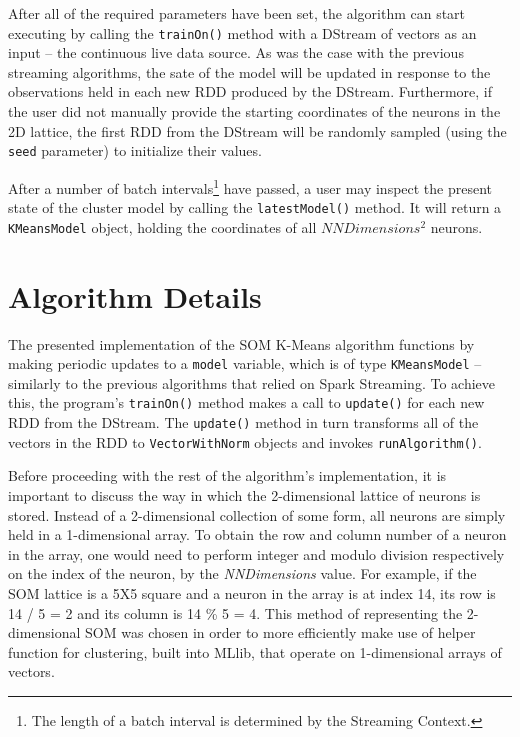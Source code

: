 \documentclass{l4proj}
\begin{document}
After all of the required parameters have been set, the algorithm can start executing by calling the \texttt{trainOn()} method with a DStream of vectors as an input -- the continuous live data source. As was the case with the previous streaming algorithms, the sate of the model will be updated in response to the observations held in each new RDD produced by the DStream. Furthermore, if the user did not manually provide the starting coordinates of the neurons in the 2D lattice, the first RDD from the DStream will be randomly sampled (using the \texttt{seed} parameter) to initialize their values.

After a number of batch intervals\footnote{The length of a batch interval is determined by the Streaming Context.} have passed, a user may inspect the present state of the cluster model by calling the \texttt{latestModel()} method. It will return a \texttt{KMeansModel} object, holding the coordinates of all $NNDimensions^2$ neurons.

\section{Algorithm Details}

The presented implementation of the SOM K-Means algorithm functions by making periodic updates to a \texttt{model} variable, which is of type \texttt{KMeansModel} -- similarly to the previous algorithms that relied on Spark Streaming. To achieve this, the program's \texttt{trainOn()} method makes a call to \texttt{update()} for each new RDD from the DStream. The \texttt{update()} method in turn transforms all of the vectors in the RDD to \texttt{VectorWithNorm} objects and invokes \texttt{runAlgorithm()}.

Before proceeding with the rest of the algorithm's implementation, it is important to discuss the way in which the 2-dimensional lattice of neurons is stored. Instead of a 2-dimensional collection of some form, all neurons are simply held in a 1-dimensional array. To obtain the row and column number of a neuron in the array, one would need to perform integer and modulo division respectively on the index of the neuron, by the \textit{NNDimensions} value. For example, if the SOM lattice is a 5X5 square and a neuron in the array is at index 14, its row is 14 / 5 = 2  and its column is 14 \% 5 = 4. This method of representing the 2-dimensional SOM was chosen in order to more efficiently make use of helper function for clustering, built into MLlib, that operate on 1-dimensional arrays of vectors.
\end{document}
